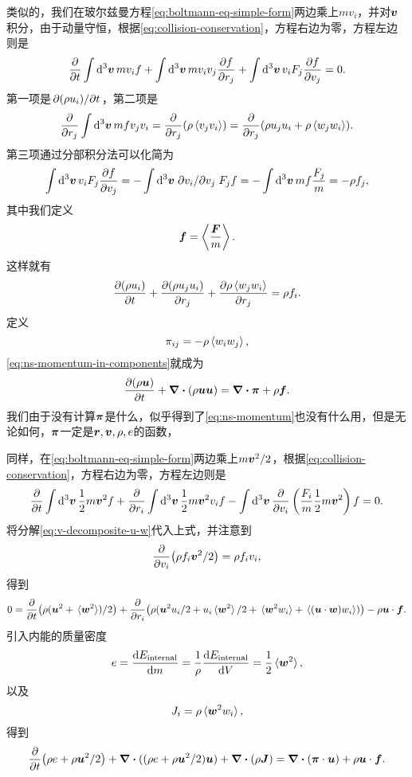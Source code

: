 类似的，我们在玻尔兹曼方程\eqref{eq:boltmann-eq-simple-form}两边乘上$m v_i$，并对$\vb*{v}$积分，由于动量守恒，根据\eqref{eq:collision-conservation}，方程右边为零，方程左边则是
\[
    \pdv{t} \int \dd[3]{\vb*{v}} m v_i f + \int \dd[3]{\vb*{v}} m v_i v_j \pdv{f}{r_j} + \int \dd[3]{\vb*{v}} v_i F_j \pdv{f}{v_j} = 0.
\]
第一项是$\pdv*{(\rho u_i)}{t}$，第二项是
\[
    \pdv{r_j} \int \dd[3]{\vb*{v}} mf v_j v_i = \pdv{r_j} (\rho \expval{v_j v_i}) = \pdv{r_j} (\rho u_j u_i + \rho \expval{w_j w_i}).
\]
第三项通过分部积分法可以化简为
\[
    \int \dd[3]{\vb*{v}} v_i F_j \pdv{f}{v_j} = - \int \dd[3]{\vb*{v}} \pdv*{v_i}{v_j} F_j f = - \int \dd[3]{\vb*{v}} m f \frac{F_j}{m} = - \rho f_j,
\]
其中我们定义
\begin{equation}
    \vb*{f} = \expval{\frac{\vb*{F}}{m}}.
\end{equation}
这样就有
\begin{equation}
    \pdv{(\rho u_i)}{t} + \pdv{(\rho u_j u_i)}{r_j} + \pdv{\rho \expval*{w_j w_i}}{r_j} = \rho f_i.
    \label{eq:ns-momentum-in-components}
\end{equation}
定义
\begin{equation}
    \pi_{ij} = - \rho \expval*{w_i w_j},
\end{equation}
\eqref{eq:ns-momentum-in-components}就成为
\begin{equation}
    \pdv{(\rho \vb*{u})}{t} + \div{(\rho \vb*{u} \vb*{u})} = \div{\vb*{\pi}} + \rho \vb*{f}.
    \label{eq:ns-momentum}
\end{equation}
我们由于没有计算$\vb*{\pi}$是什么，似乎得到了\eqref{eq:ns-momentum}也没有什么用，但是无论如何，$\vb*{\pi}$一定是$\vb*{r}, \vb*{v}, \rho, e$的函数，

同样，在\eqref{eq:boltmann-eq-simple-form}两边乘上$m \vb*{v}^2 / 2$，根据\eqref{eq:collision-conservation}，方程右边为零，方程左边则是
\[
    \pdv{t} \int \dd[3]{\vb*{v}} \frac{1}{2} m \vb*{v}^2 f + \pdv{r_i} \int \dd[3]{\vb*{v}} \frac{1}{2} m \vb*{v}^2 v_i f - \int \dd[3]{\vb*{v}} \pdv{v_i} \left( \frac{F_i}{m} \frac{1}{2} m \vb*{v}^2 \right) f = 0.
\]
将分解\eqref{eq:v-decomposite-u-w}代入上式，并注意到
\[
    \pdv{v_i} (\rho f_i \vb*{v}^2 / 2) = \rho f_i v_i,
\]
得到
\[
    0 = \pdv{t} (\rho (\vb*{u}^2 + \expval*{\vb*{w}^2}) / 2) + \pdv{r_i} (\rho (\vb*{u}^2 u_i / 2 + u_i \expval*{\vb*{w}^2} /2 + \expval*{\vb*{w}^2 w_i} + \expval*{(\vb*{u} \cdot \vb*{w}) w_i})) - \rho \vb*{u} \cdot \vb*{f}. 
\]
引入内能的质量密度
\begin{equation}
    e = \dv{E_\text{internal}}{m} = \frac{1}{\rho} \dv{E_\text{internal}}{V} = \frac{1}{2} \expval*{\vb*{w}^2},
\end{equation}
以及
\begin{equation}
    J_i = \rho \expval*{\vb*{w}^2 w_i},
\end{equation}
得到
\begin{equation}
    \pdv{t} (\rho e + \rho \vb*{u}^2 / 2) + \div{((\rho e + \rho \vb*{u}^2 / 2) \vb*{u})} + \div{(\rho \vb*{J})} = \div{(\vb*{\pi} \cdot \vb*{u})} + \rho \vb*{u} \cdot \vb*{f}.
    \label{eq:ns-energy}
\end{equation}

